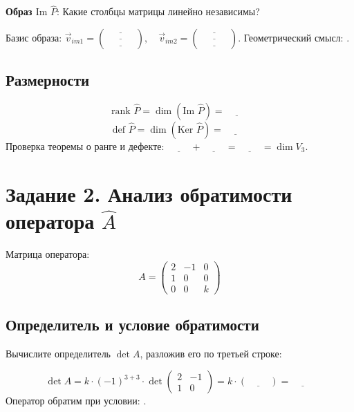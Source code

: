 \documentclass[a4paper,12pt]{article}
\newcommand{\blank}[1][5cm]{\underline{\hspace{#1}}}
\newenvironment{solutionbox}{
    \vspace{0.5em}
    \noindent\begin{tcolorbox}[colback=white!95!gray, colframe=gray!50!white, title=\textbf{Место для решения}, sharp corners]
}{
    \end{tcolorbox}
    \vspace{0.5em}
}
\begin{document}
\textbf{Образ $\text{Im }\hat{P}$}: Какие столбцы матрицы линейно независимы?

\begin{solutionbox}
Базис образа: $\vec{v}_{im1} = \begin{pmatrix} \blank[1cm] \\ \blank[1cm] \\ \blank[1cm] \end{pmatrix}, \quad \vec{v}_{im2} = \begin{pmatrix} \blank[1cm] \\ \blank[1cm] \\ \blank[1cm] \end{pmatrix}$.
Геометрический смысл: \blank[6cm].
\end{solutionbox}

\subsection{Размерности}
\[
\text{rank } \hat{P} = \dim(\text{Im }\hat{P}) = \blank[1cm]
\]
\[
\text{def } \hat{P} = \dim(\text{Ker }\hat{P}) = \blank[1cm]
\]
Проверка теоремы о ранге и дефекте: $\blank[1cm] + \blank[1cm] = \blank[1cm] = \dim V_3$.

\section{Задание 2. Анализ обратимости оператора $\hat{A}$}

Матрица оператора:
\[
A = \begin{pmatrix} 
2 & -1 & 0 \\ 
1 & 0 & 0 \\ 
0 & 0 & k 
\end{pmatrix}
\]

\subsection{Определитель и условие обратимости}
Вычислите определитель $\det A$, разложив его по третьей строке:

\begin{solutionbox}
\[
\det A = k \cdot (-1)^{3+3} \cdot \det \begin{pmatrix} 2 & -1 \\ 1 & 0 \end{pmatrix} = k \cdot (\blank[1cm]) = \blank[1cm]
\]
Оператор обратим при условии: \blank[3cm].
\end{solutionbox}
\end{document}
